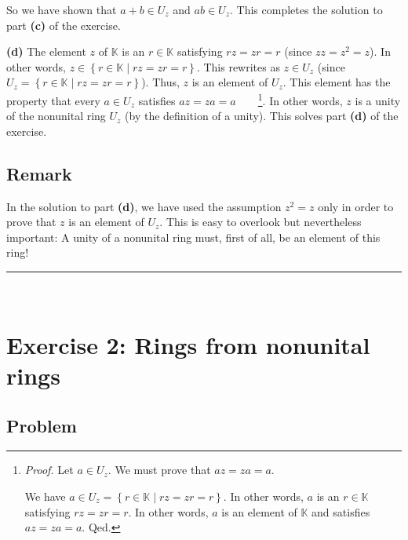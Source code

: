 \documentclass[paper=a4, fontsize=12pt]{scrartcl}%
\theoremstyle{plainsl}
\theoremstyle{definition}
\theoremstyle{remark}
\begin{document}
So we have shown that $a+b\in U_{z}$ and $ab\in U_{z}$. This completes the
solution to part \textbf{(c)} of the exercise.

\bigskip

\textbf{(d)} The element $z$ of $\mathbb{K}$ is an $r\in\mathbb{K}$ satisfying
$rz=zr=r$ (since $zz=z^{2}=z$). In other words, $z\in\left\{  r\in
\mathbb{K}\mid rz=zr=r\right\}  $. This rewrites as $z\in U_{z}$ (since
$U_{z}=\left\{  r\in\mathbb{K}\mid rz=zr=r\right\}  $). Thus, $z$ is an
element of $U_{z}$. This element has the property that every $a\in U_{z}$
satisfies $az=za=a$\ \ \ \ \footnote{\textit{Proof.} Let $a\in U_{z}$. We must
prove that $az=za=a$.
\par
We have $a\in U_{z}=\left\{  r\in\mathbb{K}\mid rz=zr=r\right\}  $. In other
words, $a$ is an $r\in\mathbb{K}$ satisfying $rz=zr=r$. In other words, $a$ is
an element of $\mathbb{K}$ and satisfies $az=za=a$. Qed.}. In other words, $z$
is a unity of the nonunital ring $U_{z}$ (by the definition of a unity). This
solves part \textbf{(d)} of the exercise.

\subsection{Remark}

In the solution to part \textbf{(d)}, we have used the assumption $z^{2}=z$
only in order to prove that $z$ is an element of $U_{z}$. This is easy to
overlook but nevertheless important: A unity of a nonunital ring must, first
of all, be an element of this ring!

\rule{\linewidth}{0.3pt} \\[0.4cm]

\section{Exercise 2: Rings from nonunital rings}

\subsection{Problem}
\end{document}
